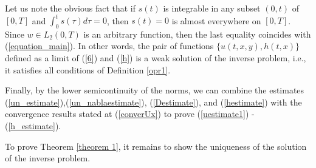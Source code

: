 \documentclass[12pt]{amsart}
\theoremstyle{definition}
\numberwithin{equation}{section}
\begin{document}
Let us note the obvious fact that if $s(t)$ is integrable in any subset $(0,t)$ of $[0,T]$ and $\int_0^t s(\tau) d\tau =0$, then $s(t)=0$ is almost everywhere on $[0,T]$. Since $w\in L_2(0, T)$ is an arbitrary function, then the last equality coincides with (\ref{equation_main}). In other words, the pair of functions $\{u(t,x,y), h(t,x)\}$ defined as a limit of (\ref{6}) and (\ref{h}) is a weak solution of the inverse problem, i.e., it satisfies all conditions of Definition \ref{opr1}. 

Finally, by the lower semicontinuity of the norms, we can combine the
estimates (\ref{un_estimate}),(\ref{un_nablaestimate}), (\ref{Destimate}),  and (\ref{hestimate}) with the convergence results stated at
(\ref{converUx}) to prove (\ref{uestimate1}) - (\ref{h_estimate}). 



To prove Theorem \ref{theorem 1}, it remains to show the uniqueness of the solution of the inverse problem. 
\end{document}
